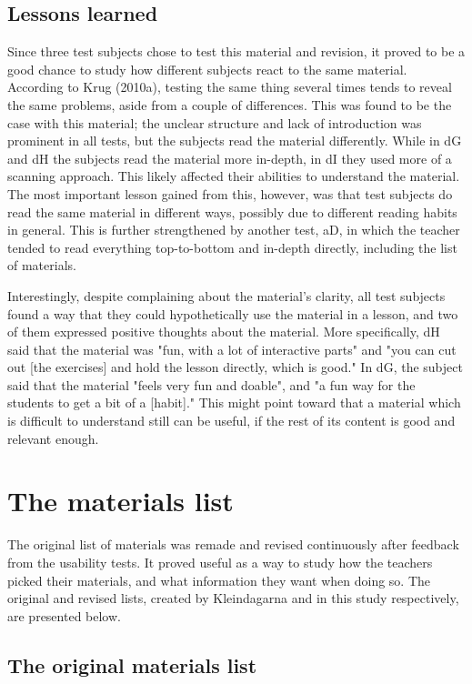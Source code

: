 \subsection{Lessons learned}

Since three test subjects chose to test this material and revision, it proved to be a good chance to study how different subjects react to the same material. According to Krug (2010a), testing the same thing several times tends to reveal the same problems, aside from a couple of differences. This was found to be the case with this material; the unclear structure and lack of introduction was prominent in all tests, but the subjects read the material differently. While in dG and dH the subjects read the material more in-depth, in dI they used more of a scanning approach. This likely affected their abilities to understand the material. The most important lesson gained from this, however, was that test subjects do read the same material in different ways, possibly due to different reading habits in general. This is further strengthened by another test, aD, in which the teacher tended to read everything top-to-bottom and in-depth directly, including the list of materials.

Interestingly, despite complaining about the material's clarity, all test subjects found a way that they could hypothetically use the material in a lesson, and two of them expressed positive thoughts about the material. More specifically, dH said that the material was "fun, with a lot of interactive parts" and "you can cut out [the exercises] and hold the lesson directly, which is good." In dG, the subject said that the material "feels very fun and doable", and "a fun way for the students to get a bit of a [habit]." This might point toward that a material which is difficult to understand still can be useful, if the rest of its content is good and relevant enough.

\section{The materials list}

The original list of materials was remade and revised continuously after feedback from the usability tests. It proved useful as a way to study how the teachers picked their materials, and what information they want when doing so. The original and revised lists, created by Kleindagarna and in this study respectively, are presented below.

\subsection{The original materials list}

